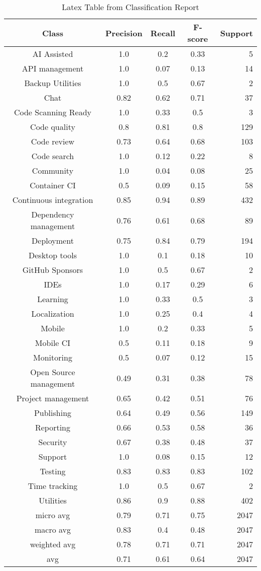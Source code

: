 \begin{table}
\caption{Latex Table from Classification Report}
\label{table:classification:report}
\centering
\begin{tabular}{c | c c c r}
Class & Precision & Recall & F-score & Support\\
\midrule
AI Assisted & 1.0 & 0.2 & 0.33 & 5\\
API management & 1.0 & 0.07 & 0.13 & 14\\
Backup Utilities & 1.0 & 0.5 & 0.67 & 2\\
Chat & 0.82 & 0.62 & 0.71 & 37\\
Code Scanning Ready & 1.0 & 0.33 & 0.5 & 3\\
Code quality & 0.8 & 0.81 & 0.8 & 129\\
Code review & 0.73 & 0.64 & 0.68 & 103\\
Code search & 1.0 & 0.12 & 0.22 & 8\\
Community & 1.0 & 0.04 & 0.08 & 25\\
Container CI & 0.5 & 0.09 & 0.15 & 58\\
Continuous integration & 0.85 & 0.94 & 0.89 & 432\\
Dependency management & 0.76 & 0.61 & 0.68 & 89\\
Deployment & 0.75 & 0.84 & 0.79 & 194\\
Desktop tools & 1.0 & 0.1 & 0.18 & 10\\
GitHub Sponsors & 1.0 & 0.5 & 0.67 & 2\\
IDEs & 1.0 & 0.17 & 0.29 & 6\\
Learning & 1.0 & 0.33 & 0.5 & 3\\
Localization & 1.0 & 0.25 & 0.4 & 4\\
Mobile & 1.0 & 0.2 & 0.33 & 5\\
Mobile CI & 0.5 & 0.11 & 0.18 & 9\\
Monitoring & 0.5 & 0.07 & 0.12 & 15\\
Open Source management & 0.49 & 0.31 & 0.38 & 78\\
Project management & 0.65 & 0.42 & 0.51 & 76\\
Publishing & 0.64 & 0.49 & 0.56 & 149\\
Reporting & 0.66 & 0.53 & 0.58 & 36\\
Security & 0.67 & 0.38 & 0.48 & 37\\
Support & 1.0 & 0.08 & 0.15 & 12\\
Testing & 0.83 & 0.83 & 0.83 & 102\\
Time tracking & 1.0 & 0.5 & 0.67 & 2\\
Utilities & 0.86 & 0.9 & 0.88 & 402\\
\midrule
micro avg & 0.79 & 0.71 & 0.75 & 2047\\
macro avg & 0.83 & 0.4 & 0.48 & 2047\\
weighted avg & 0.78 & 0.71 & 0.71 & 2047\\
avg & 0.71 & 0.61 & 0.64 & 2047\\
\end{tabular}
\end{table}
